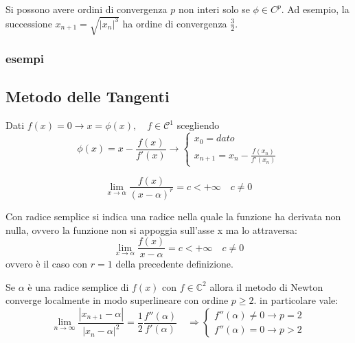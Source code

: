 \documentclass[12pt,a4paper,]{report}
\begin{document}
\begin{nota}
    Si possono avere ordini di convergenza $p$ non interi
    solo se $\phi \in C^{p}$.
    Ad esempio, la successione $x_{n+1} = \sqrt{|x_n|^3}$ ha ordine di convergenza $\frac{3}{2}$.
\end{nota}
\subsubsection{esempi}

\subsection{Metodo delle Tangenti}
\begin{metodo}
    Dati $f(x) = 0 \longrightarrow x = \phi(x), \quad f\in\mathcal{C}^1$ scegliendo
    \[
    \phi(x) = x - \frac{f(x)}{f'(x)} \longrightarrow
    \begin{cases}
        x_0 = dato \\
        x_{n+1} = x_n - \frac{f(x_n)}{f'(x_n)}
    \end{cases}
    \]
\end{metodo}
\begin{definizione}
    \[
    \lim_{x\to\alpha}\frac{f(x)}{(x-\alpha)^r} = c < +\infty \quad c\ne 0
    \]
\end{definizione}
\begin{definizione}
    Con radice semplice si indica una radice nella quale la funzione ha derivata non nulla, ovvero la funzione non si appoggia sull'asse x ma lo attraversa:
    \[
    \lim_{x\to\alpha}\frac{f(x)}{x-\alpha} = c < +\infty \quad c\ne 0
    \]
    ovvero è il caso con $r=1$ della precedente definizione.
\end{definizione}

\begin{teorema}
    Se $\alpha$ è una radice semplice di $f(x)$ con $f\in\mathbb{C}^2$ allora il metodo di Newton converge localmente in modo superlineare con ordine $p\geq 2$. in particolare vale:
    \[
    \lim_{n\to \infty} \frac{|x_{n+1}- \alpha|}{|x_n- \alpha|^2}=\frac{1}{2}\frac{f''(\alpha)}{f'(\alpha)} \quad \Longrightarrow 
    \begin{cases}
        f''(\alpha) \neq 0 \to p=2\\
        f''(\alpha)=0 \to p>2
    \end{cases}
    \]
\end{teorema}
\end{document}
